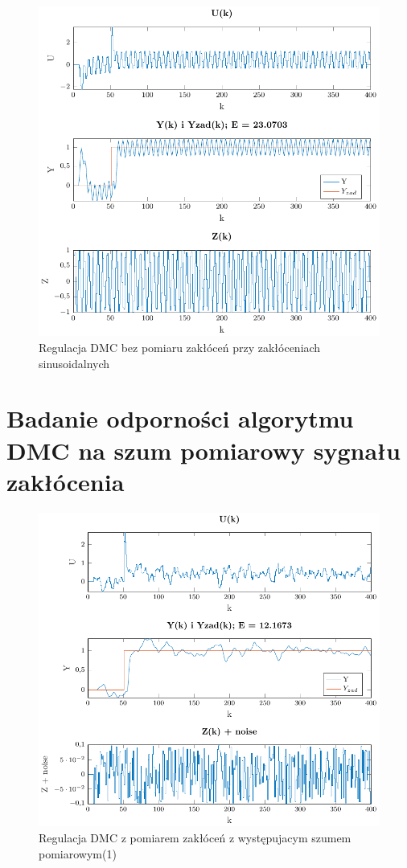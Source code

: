 \documentclass[a4paper,titlepage,11pt,twosides,floatssmall]{mwrep}
\begin{document}
\begin{figure}[H]
	\centering
	\includegraphics{../../Lab2/PDF_rysunki/Z6_DMCSinBezOdsprz.pdf}
	\caption{Regulacja DMC bez pomiaru zakłóceń przy zakłóceniach sinusoidalnych}
	\label{sin_bez_pom}
\end{figure}

\section{Badanie odporności algorytmu DMC na szum pomiarowy sygnału zakłócenia}

\begin{figure}[H]
	\centering
	\includegraphics{../../Lab2/PDF_rysunki/Z7_Szum1.pdf}
	\caption{Regulacja DMC z pomiarem zakłóceń z występujacym szumem pomiarowym(1)}
	\label{szum1}
\end{figure}
\end{document}
